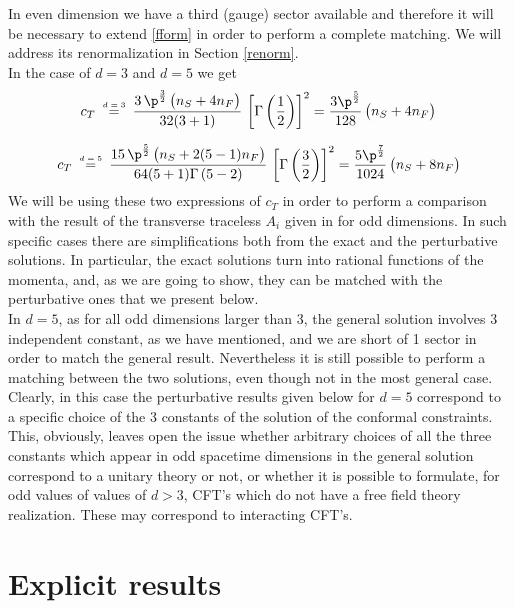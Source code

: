 \documentclass[a4paper,11pt,openright,twoside]{book}
\numberwithin{equation}{section}
\begin{document}
{{\begin{equation}
\end{equation}
In even dimension we have a third (gauge) sector available and therefore it will be necessary to extend \eqref{fform} in order to perform a complete matching. We will address its renormalization in Section \ref{renorm}.\\
In the case of $d=3$ and $d=5$ we get
\begin{equation}
	c_T\ \ \mathrel{\stackrel{\makebox[0pt]{\mbox{\normalfont\tiny $d=3$}}}{=}}\ \  \frac{3\,\p^\frac{3}{2}\,\big(n_S+4 n_F\big)}{32(3+1)}\,\left[\Gamma\left(\frac{1}{2}\right)\right]^2=\frac{3\p^\frac{5}{2}}{128}\,\big(n_S+4n_F\big)\,
\end{equation}

\begin{equation}
	c_T\ \ \mathrel{\stackrel{\makebox[0pt]{\mbox{\normalfont\tiny $d=5$}}}{=}}\ \  \frac{15\,\p^\frac{5}{2}\,\big(n_S+2(5-1)n_F\big)}{64(5+1)\Gamma\left(5-2\right)}\,\left[\Gamma\left(\frac{3}{2}\right)\right]^2=\frac{5\p^\frac{7}{2}}{1024}\,\big(n_S+8n_F\big)\,
\end{equation}
We will be using these two expressions of $c_T$ in order to perform a comparison with the result of the transverse traceless $A_i$ given in \cite{Bzowski:2013sza} for odd dimensions. In such specific cases there are simplifications both from the exact and the perturbative solutions. In particular, the exact solutions turn into rational functions of the momenta, and, as we are going to show, they can be matched with the perturbative ones that we present below. \\
In $d=5$, as for all odd dimensions larger than 3, the general solution involves 3 independent constant, as we have mentioned, and we are short of 1 sector in order to match the general result. Nevertheless it is still possible to perform a matching between the two solutions, even though not in the most general case. \\
Clearly, in this case the perturbative results given below for $d=5$ correspond to a specific choice of the 3 constants of the solution of the conformal constraints. This, obviously, leaves open the issue whether arbitrary choices of all the three constants which appear in odd spacetime dimensions in the general solution correspond to a unitary theory or not, or whether it is possible to formulate, for odd values of values of $d > 3$, CFT's which do not have a free field theory realization. These may correspond to interacting CFT's.   
\section{Explicit results}
\label{d35}
}}
\end{document}

